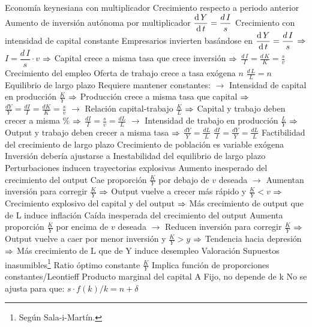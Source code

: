 \documentclass{nuevotema}
\begin{document}
\begin{esquemal}
				\4 Economía keynesiana con multiplicador
				\4 Crecimiento respecto a periodo anterior
				\4[] Aumento de inversión autónoma por multiplicador
				\4[] $\dfrac{\text{d} \, Y}{\text{d} \, t} = \dfrac{d \, I}{s}$
			\3 Crecimiento con intensidad de capital constante
				\4 Empresarios invierten basándose en $\dfrac{\text{d} \, Y}{\text{d} \, t} = \dfrac{d \, I}{s}$
				\4[] $\then$ $I = \dfrac{d \, I}{s} \cdot v$ $\then$ 
				\4[] Capital crece a misma tasa que crece inversión
				\4[] $\then$ $\frac{d \, I}{I} = \frac{d \, K}{K} = \frac{s}{v}$
			\3 Crecimiento del empleo
				\4 Oferta de trabajo crece a tasa exógena $n$
				\4[] $\frac{d \, L}{L} = n$
			\3 Equilibrio de largo plazo
				\4 Requiere mantener constantes:
				\4[] $\to$ Intensidad de capital en producción $\frac{K}{Y}$
				\4[] $\then$ Producción crece a misma tasa que capital
				\4[] $\then$ $\frac{dY}{Y} = \frac{dI}{I} = \frac{dK}{K} = \frac{s}{v}$
				\4[] $\to$ Relación capital-trabajo $\frac{K}{L}$
				\4[] $\then$ Capital y trabajo deben crecer a misma \%
				\4[] $\then$ $\frac{dI}{I} = \frac{s}{v} = \frac{dL}{L}$
				\4[] $\to$ Intensidad de trabajo en producción $\frac{L}{Y}$
				\4[] $\then$ Output y trabajo deben crecer a misma tasa
				\4[] $\then$ $\frac{dY}{Y} = \frac{dL}{L}$
				\4[$\then$] $\frac{d I}{I} = \frac{d Y}{Y} = \frac{d L}{L}$
			\3 Factibilidad del crecimiento de largo plazo
				\4 Crecimiento de población es variable exógena
				\4[$\then$] Inversión debería ajustarse a
			\3 Inestabilidad del equilibrio de largo plazo
				\4 Perturbaciones inducen trayectorias explosivas
				\4 Aumento inesperado del crecimiento del output
				\4[] Cae proporción $\frac{K}{Y}$ por debajo de $v$ deseada
				\4[] $\to$ Aumentan inversión para corregir $\frac{K}{Y}$
				\4[] $\then$ Output vuelve a crecer más rápido y $\frac{K}{Y} < v$
				\4[] $\then$ Crecimiento explosivo del capital y del output
				\4[] $\then$ Más crecimiento de output que de L induce inflación
				\4 Caída inesperada del crecimiento del output
				\4[] Aumenta proporción $\frac{K}{Y}$ por encima de $v$ deseada
				\4[] $\to$ Reducen inversión para corregir $\frac{K}{Y}$
				\4[] $\then$ Output vuelve a caer por menor inversión y $\frac{K}{Y} > y$
				\4[] $\then$ Tendencia hacia depresión
				\4[] $\then$ Más crecimiento de L que de Y induce desempleo
		\2 Valoración
			\3 Supuestos inasumibles\footnote{Según Sala-i-Martín.}
				\4 Ratio óptimo constante $\frac{K}{Y}$
				\4[] Implica función de proporciones constantes/Leontieff
				\4 Producto marginal del capital A
				\4[] Fijo, no depende de k
				\4[] No se ajusta para que: $s \cdot f(k)/k = n + \delta$

\end{esquemal}
\end{document}

